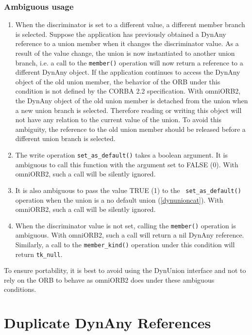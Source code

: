 \documentclass[11pt,twoside,onecolumn]{book}
\begin{document}
\subsubsection{Ambiguous usage}

\begin{enumerate}

\item When the discriminator is set to a different value, a different
member branch is selected. Suppose the application has previously obtained
a DynAny reference to a union member when it changes the discriminator
value. As a result of the value change, the union is now instantiated to
another union branch, i.e. a call to the {\tt member()} operation will now
return a reference to a different DynAny object. If the application
continues to access the DynAny object of the old union member, the behavior
of the ORB under this condition is not defined by the CORBA 2.2
specification. With omniORB2, the DynAny object of the old union member is
detached from the union when a new union branch is selected. Therefore
reading or writing this object will not have any relation to the current
value of the union. To avoid this ambiguity, the reference to the old union
member should be released before a different union branch is selected.

\item The write operation {\tt set\_as\_default()} takes a boolean
argument. It is ambiguous to call this function with the argument set to
FALSE (0). With omniORB2, such a call will be silently ignored.

\item It is also ambiguous to pass the value TRUE (1) to the {\tt
set\_as\_default()} operation when the union is a no default union
(\ref{dynunioncat}). With omniORB2, such a call will be silently ignored.

\item When the discriminator value is not set, calling the {\tt member()}
operation is ambiguous. With omniORB2, such a call will return a nil DynAny
reference. Similarly, a call to the {\tt member\_kind()} operation under
this condition will return {\tt tk\_null}.

\end{enumerate}

To ensure portability, it is best to avoid using the DynUnion interface
and not to rely on the ORB to behave as omniORB2 does under these ambiguous
conditions.

\section{Duplicate DynAny References}
\end{document}
